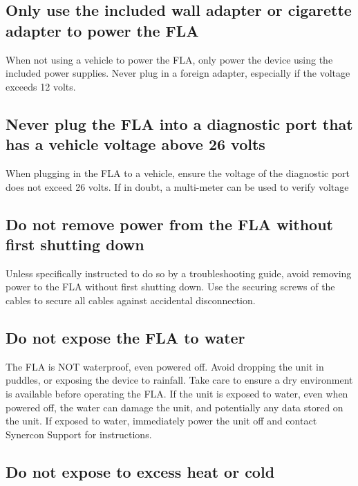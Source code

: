 \documentclass[11pt, oneside]{book}
\begin{document}


\subsection*{Only use the included wall adapter or cigarette adapter to power
the FLA}

When not using a vehicle to power the FLA, only power the device using
the included power supplies. Never plug in a foreign adapter, especially
if the voltage exceeds 12 volts.


\subsection*{Never plug the FLA into a diagnostic port that has a vehicle voltage
above 26 volts}

When plugging in the FLA to a vehicle, ensure the voltage of the diagnostic
port does not exceed 26 volts. If in doubt, a multi-meter can be used
to verify voltage


\subsection*{Do not remove power from the FLA without first shutting down}

Unless specifically instructed to do so by a troubleshooting guide,
avoid removing power to the FLA without first shutting down. Use the
securing screws of the cables to secure all cables against accidental
disconnection.


\subsection*{Do not expose the FLA to water}

The FLA is NOT waterproof, even powered off. Avoid dropping the unit
in puddles, or exposing the device to rainfall. Take care to ensure
a dry environment is available before operating the FLA. If the unit
is exposed to water, even when powered off, the water can damage the
unit, and potentially any data stored on the unit. If exposed to water,
immediately power the unit off and contact Synercon Support for instructions.


\subsection*{Do not expose to excess heat or cold}
\end{document}
